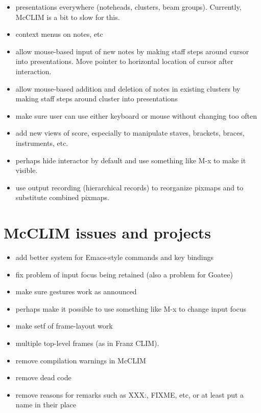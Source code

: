 \begin{itemize}
\item presentations everywhere (noteheads, clusters, beam groups).
  Currently, McCLIM is a bit to slow for this.  
\item context menus on notes, etc
\item allow mouse-based input of new notes by making staff steps
  around cursor into presentations.  Move pointer to horizontal
  location of cursor after interaction.
\item allow mouse-based addition and deletion of notes in existing
  clusters by making staff steps around cluster into presentations
\item make sure user can use either keyboard or mouse without changing
  too often
\item add new views of score, especially to manipulate staves,
  brackets, braces, instruments, etc.
\item perhaps hide interactor by default and use something like M-x to
  make it visible. 
\item use output recording (hierarchical records) to reorganize pixmaps
  and to substitute combined pixmaps. 
\end{itemize}

\section{McCLIM issues and projects}

\begin{itemize}
\item add better system for Emacs-style commands and key
  bindings 
\item fix problem of input focus being retained (also a
  problem for Goatee)
\item make sure gestures work as announced
\item perhaps make it possible to use something like M-x to change
  input focus
\item make setf of frame-layout work
\item multiple top-level frames (as in Franz CLIM).
\item remove compilation warnings in McCLIM
\item remove dead code
\item remove reasons for remarks such as XXX:, FIXME, etc, or at least
  put a name in their place
\end{itemize}